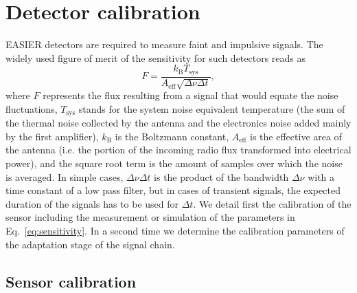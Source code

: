 \section{Detector calibration}
\label{sec:calibration}	
EASIER  detectors   are  required  to  measure   faint  and  impulsive
signals. The widely used  figure of merit of the  sensitivity for such
detectors reads as
\begin{equation}
F  =  \frac{k_{\text{B}}  T_{\text{sys}} }{A_{\text{eff}} \sqrt{\Delta  \nu    \Delta t}},
\label{eq:sensitivity}  
\end{equation}
where  $F$ represents  the flux  resulting  from a  signal that  would
equate the noise fluctuations,  $T_{\text{sys}}$ stands for the system
noise equivalent  temperature (the sum of the  thermal noise collected
by the  antenna and  the electronics noise  added mainly by  the first
amplifier), $k_\text{B}$  is the Boltzmann  constant, $A_{\text{eff}}$
is  the  effective area  of  the antenna  (i.e.   the  portion of  the
incoming radio flux transformed into electrical power), and the square
root  term  is  the  amount   of  samples  over  which  the  noise  is
averaged. In simple cases, $\Delta \nu \Delta t$ is the product of the
bandwidth $\Delta \nu$ with a time  constant of a low pass filter, but
in cases  of transient signals,  the expected duration of  the signals
has to be used for $\Delta t$.  We detail first the calibration of the
sensor including  the measurement or  simulation of the  parameters in
Eq.~\eqref{eq:sensitivity}.   In  a   second  time  we  determine  the
calibration parameters of the adaptation stage of the signal chain.

\subsection{Sensor calibration}
\label{sec:calibrationsensor}
